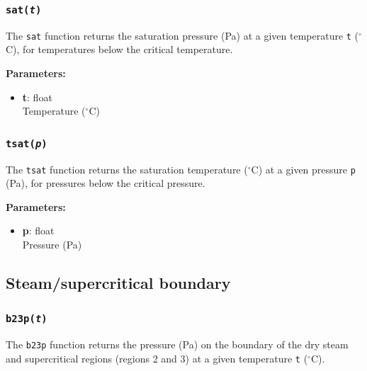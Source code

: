 \begin{snugshade}
\subsubsection{\texttt{sat(\emph{t})}}
\end{snugshade}
\label{sec:iapws97:sat}

The \texttt{sat} function returns the saturation pressure (Pa) at a given temperature \texttt{t} ($^{\circ}$C), for temperatures below the critical temperature.

\textbf{Parameters:}
\begin{itemize}
\item \textbf{t}: float\\
  Temperature ($^{\circ}$C)
\end{itemize}

\begin{snugshade}
\subsubsection{\texttt{tsat(\emph{p})}}
\end{snugshade}
\label{sec:iapws97:tsat}

The \texttt{tsat} function returns the saturation temperature ($^{\circ}$C) at a given pressure \texttt{p} (Pa), for pressures below the critical pressure.

\textbf{Parameters:}
\begin{itemize}
\item \textbf{p}: float\\
  Pressure (Pa)
\end{itemize}

\subsection{Steam/supercritical boundary}
\label{region23_boundary}

\begin{snugshade}
\subsubsection{\texttt{b23p(\emph{t})}}
\end{snugshade}
\label{sec:iapws97:b23p}

The \texttt{b23p} function returns the pressure (Pa) on the boundary of the dry steam and supercritical regions (regions 2 and 3) at a given temperature \texttt{t} ($^{\circ}$C).

